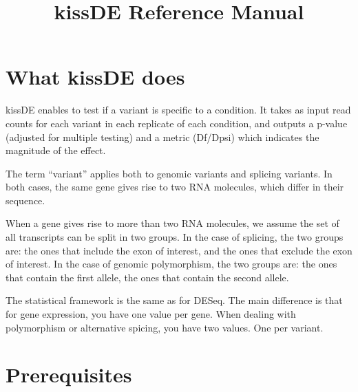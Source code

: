 \documentclass[english, a4paper, 12pt]{article}
\title{kissDE Reference Manual}
\author{}
\begin{document}
\maketitle

\section{What kissDE does}
kissDE enables to test if a variant is specific to a condition.
It takes as input read counts for each variant in each replicate of each condition, and outputs a p-value (adjusted for multiple testing) and a metric (Df/Dpsi) which indicates the magnitude of the effect.

The term ``variant'' applies both to genomic variants and splicing variants.
In both cases, the same gene gives rise to two RNA molecules, which differ in their sequence.

When a gene gives rise to more than two RNA molecules, we assume the set of all transcripts can be split in two groups.
In the case of splicing, the two groups are: the ones that include the exon of interest, and the ones that exclude the exon of interest.
In the case of genomic polymorphism, the two groups are: the ones that contain the first allele, the ones that contain the second allele.

The statistical framework is the same as for DESeq.
The main difference is that for gene expression, you have one value per gene. 
When dealing with polymorphism or alternative spicing, you have two values. One per variant.



\section{Prerequisites}
\end{document}
